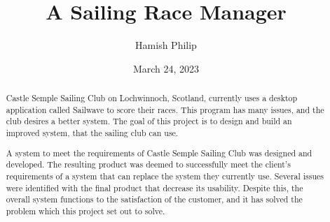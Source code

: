 \documentclass{l4proj}
\begin{document}
\title{A Sailing Race Manager}
\author{Hamish Philip}
\date{March 24, 2023}

\maketitle

\begin{abstract}
    Castle Semple Sailing Club on Lochwinnoch, Scotland, currently uses a desktop application called Sailwave to score their races. This program has many issues, and the club desires a better system. The goal of this project is to design and build an improved system, that the sailing club can use.

    A system to meet the requirements of Castle Semple Sailing Club was designed and developed. The resulting product was deemed to successfully meet the client's requirements of a system that can replace the system they currently use. Several issues were identified with the final product that decrease its usability. Despite this, the overall system functions to the satisfaction of the customer, and it has solved the problem which this project set out to solve.
\end{abstract}


%
%
\def\consentname {Hamish Philip} %
\def\consentdate {March 24, 2023} %
%
\educationalconsent


\tableofcontents
\end{document}
